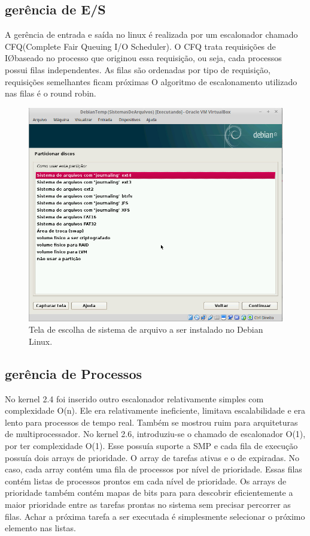\documentclass[conference]{IEEEtran}
\begin{document}
\subsection{gerência de E/S}\label{sec:LinuxES}
A gerência de entrada e saída no linux é realizada por um escalonador chamado CFQ(Complete Fair Queuing I/O Scheduler). O CFQ trata requisições de I\O baseado no processo que originou essa requisição, ou seja, cada processos possui filas independentes. As filas são ordenadas por tipo de requisição, requisições semelhantes ficam próximas O algoritmo de escalonamento utilizado nas filas é o round robin\cite{GerenciaIOLinux}.
\begin{figure}[h!]
	\centering
	\includegraphics[scale=0.3]{SistemasArquivosLinux.jpeg}
	\caption{Tela de escolha de sistema de arquivo a ser instalado no Debian Linux.}
	\label{fig:SisAqrLinux}
\end{figure}
\subsection{gerência de Processos}\label{sec:LinuxPROC}
No kernel 2.4 foi  inserido outro escalonador relativamente simples com complexidade O(n). Ele era relativamente ineficiente, limitava escalabilidade e era lento para processos de tempo real. Também se mostrou ruim para arquiteturas de multiprocessador. No kernel 2.6, introduziu-se o chamado de escalonador O(1), por ter complexidade O(1). Esse possuía suporte a SMP e cada fila de execução possuía dois arrays de prioridade.
O array de tarefas ativas e o de expiradas. No caso, cada array contém uma fila de processos por nível de prioridade. Essas filas contém listas de processos prontos em cada nível de prioridade. Os  arrays de prioridade também contém mapas de bits para para descobrir eficientemente a maior prioridade entre as tarefas prontas no sistema sem precisar percorrer as filas. Achar a próxima tarefa a ser executada é simplesmente selecionar o próximo elemento nas listas.\\
\end{document}
